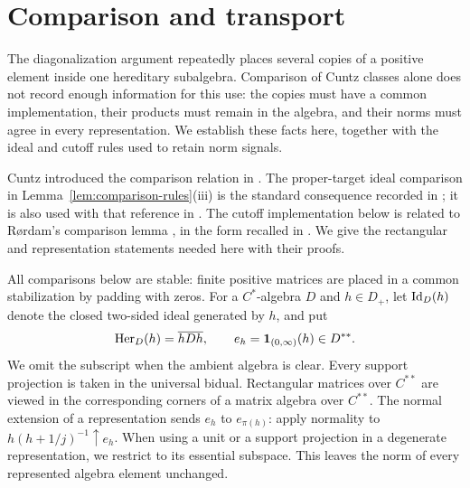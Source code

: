 \section{Comparison and transport}\label{sec:foundations}

The diagonalization argument repeatedly places several copies of a
positive element inside one hereditary subalgebra.  Comparison of
Cuntz classes alone does not record enough information for this use:
the copies must have a common implementation, their products must
remain in the algebra, and their norms must agree in every
representation.  We establish these facts here, together with the
ideal and cutoff rules used to retain norm signals.

Cuntz introduced the comparison relation in \cite{Cuntz1978}.
The proper-target ideal comparison in
Lemma~\ref{lem:comparison-rules}(iii) is the standard consequence
recorded in \cite[Proposition~3.5(ii)]{KR2000}; it is also used with
that reference in
\cite[proof of Proposition~2.38]{KwasniewskiMeyer2023}.
The cutoff implementation below is related to R{\o}rdam's
comparison lemma \cite[Proposition~2.4]{Rordam1992}, in the form
recalled in \cite[Section~2.1]{AntoinePereraThiel2020}.
We give the rectangular and representation statements needed here
with their proofs.

All comparisons below are stable: finite positive matrices are
placed in a common stabilization by padding with zeros.  For a
\(C^*\)-algebra \(D\) and \(h\in D_+\), let \(\operatorname{Id}_D(h)\)
denote the closed two-sided ideal generated by \(h\), and put
\[
 \operatorname{Her}_D(h)=\overline{hDh},\qquad
 e_h=\mathbf 1_{(0,\infty)}(h)\in D^{**}.
\]
We omit the subscript when the ambient algebra is clear.  Every
support projection is taken in the universal bidual.  Rectangular
matrices over \(C^{**}\) are viewed in the corresponding corners of
a matrix algebra over \(C^{**}\).  The normal extension of a
representation sends \(e_h\) to \(e_{\pi(h)}\): apply normality to
\(h(h+1/j)^{-1}\uparrow e_h\).  When using a unit or a support
projection in a degenerate representation, we restrict to its
essential subspace.  This leaves the norm of every represented
algebra element unchanged.

